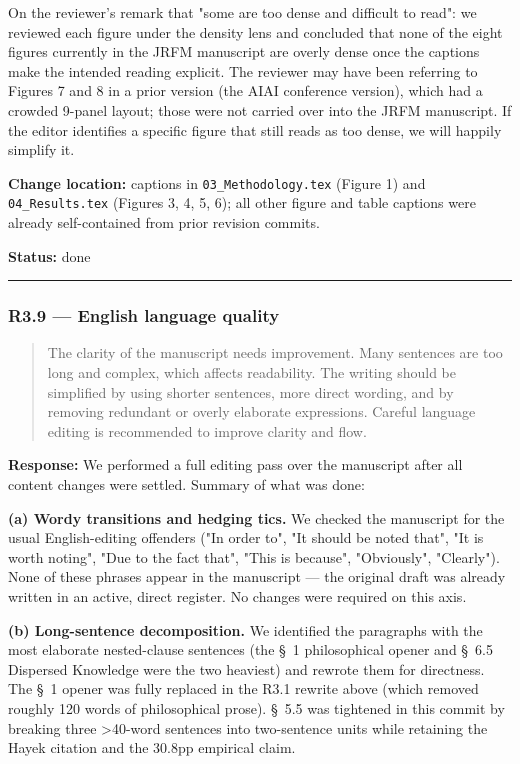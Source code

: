 \documentclass[11pt,a4paper]{article}
\begin{document}
On the reviewer's remark that "some are too dense and difficult to
read": we reviewed each figure under the density lens and concluded
that none of the eight figures currently in the JRFM manuscript are
overly dense once the captions make the intended reading explicit. The
reviewer may have been referring to Figures 7 and 8 in a prior
version (the AIAI conference version), which had a crowded 9-panel
layout; those were not carried over into the JRFM manuscript. If the
editor identifies a specific figure that still reads as too dense, we
will happily simplify it.

\textbf{Change location:} captions in \texttt{03\_Methodology.tex} (Figure 1) and
\texttt{04\_Results.tex} (Figures 3, 4, 5, 6); all other figure and table
captions were already self-contained from prior revision commits.

\textbf{Status:} done

\bigskip\hrule\bigskip

\subsubsection*{R3.9 --- English language quality}

\begin{quote}
The clarity of the manuscript needs improvement. Many sentences are too long and complex, which affects readability. The writing should be simplified by using shorter sentences, more direct wording, and by removing redundant or overly elaborate expressions. Careful language editing is recommended to improve clarity and flow.
\end{quote}

\textbf{Response:} We performed a full editing pass over the manuscript
after all content changes were settled. Summary of what was done:

\textbf{(a) Wordy transitions and hedging tics.} We checked the manuscript
for the usual English-editing offenders ("In order to", "It should be
noted that", "It is worth noting", "Due to the fact that", "This is
because", "Obviously", "Clearly"). None of these phrases appear in
the manuscript --- the original draft was already written in an active,
direct register. No changes were required on this axis.

\textbf{(b) Long-sentence decomposition.} We identified the paragraphs
with the most elaborate nested-clause sentences (the \S{}~1 philosophical
opener and \S{}~6.5 Dispersed Knowledge were the two heaviest) and rewrote
them for directness. The \S{}~1 opener was fully replaced in the R3.1
rewrite above (which removed roughly 120 words of philosophical prose).
\S{}~5.5 was tightened in this commit by breaking three >40-word sentences
into two-sentence units while retaining the Hayek citation and the
30.8pp empirical claim.
\end{document}
